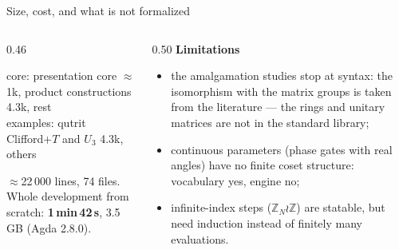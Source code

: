 \begin{frame}{Size, cost, and what is not formalized}
\begin{columns}[c]
\begin{column}{0.46\textwidth}
\centering
{}

{\scriptsize core: presentation core $\approx$1k, product constructions 4.3k, rest\\
examples: qutrit Clifford+$T$ and $U_3$ 4.3k, others}
\vspace{6pt}

\small $\approx$22\,000 lines, 74 files. Whole development from scratch:
\textbf{1\,min\,42\,s}, 3.5\,GB (Agda 2.8.0).
\end{column}
\begin{column}{0.50\textwidth}
\textbf{Limitations}
\begin{itemize}
  \small
  \item the amalgamation studies stop at \alert{syntax}: the isomorphism with the
        matrix groups is taken from the literature --- the rings and unitary
        matrices are not in the standard library;
  \item \alert{continuous parameters} (phase gates with real angles) have no finite
        coset structure: vocabulary yes, engine no;
  \item \alert{infinite-index} steps ($\mathbb{Z}_N\wr\mathbb{Z}$) are statable, but
        need induction instead of finitely many evaluations.
\end{itemize}
\end{column}
\end{columns}
\end{frame}

